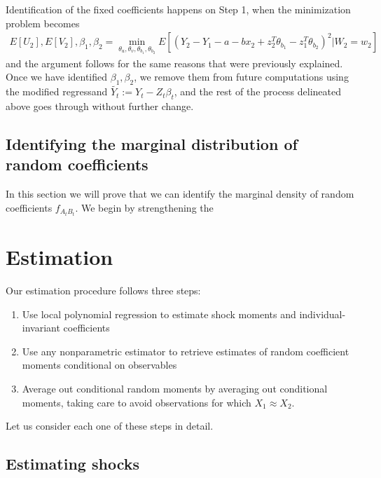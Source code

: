 Identification of the fixed coefficients happens on Step 1, when the minimization problem becomes
\begin{align}
 E[U_2], E[V_2], \beta_1, \beta_2  = \min_{\theta_u, \theta_v, \theta_{b_1}, \theta_{b_2}}  
  E[(Y_{2} - Y_{1} - a - bx_2 + z_2^{T}\theta_{b_1} - z_1^{T}\theta_{b_2})^2 | W_2 = w_2]
\end{align}
and the argument follows for the same reasons that were previously explained. Once we have identified $\beta_1, \beta_2$, we remove them from future computations using the modified regressand $\tilde{Y_t} := Y_{t} - Z_{t}\beta_{t}$, and the rest of the process delineated above goes through without further change.



\subsection{Identifying the marginal distribution of random coefficients}

In this section we will prove that we can identify the marginal density of random coefficients $f_{A_tB_t}$. We begin by strengthening the 




\section{Estimation} \label{sec:estimation}

Our estimation procedure follows three steps:

\begin{enumerate}
  \item Use local polynomial regression to estimate shock moments and individual-invariant coefficients
  \item Use any nonparametric estimator to retrieve estimates of random coefficient moments conditional on observables
  \item Average out conditional random moments by averaging out conditional moments, taking care to avoid
  observations for which $X_1 \approx X_2$.
\end{enumerate}

Let us consider each one of these steps in detail.

\subsection*{Estimating shocks}


